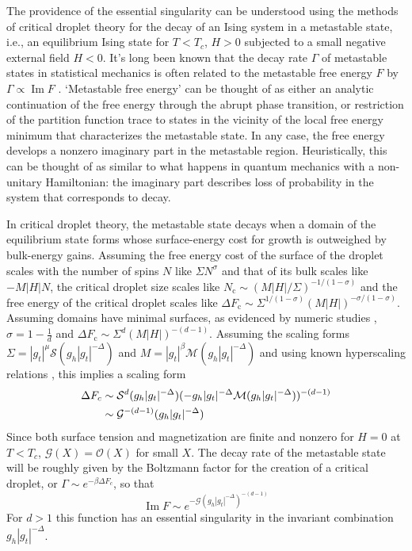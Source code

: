 \documentclass[aps,prl,reprint]{revtex4-1}
\def\[{\begin{equation}}
\def\]{\end{equation}}
\def\im{\mathop{\mathrm{Im}}\nolimits}
\def\O{\mathcal O}
\def\c{\mathrm c}
\begin{document}
The providence of the essential singularity can be understood using the
methods of critical droplet theory for the decay of an Ising system in a
metastable state, i.e., an equilibrium Ising state for $T<T_c$, $H>0$
subjected to a small negative external field $H<0$.
It's long been known that the decay rate $\Gamma$ of metastable states in
statistical mechanics is often related to the metastable free energy $F$ by
$\Gamma\propto\im F$
\cite{langer.1967.condensation,langer.1969.metastable,gaveau.1989.analytic,privman.1982.analytic}.
`Metastable free energy' can be thought of as either an analytic continuation of the free energy
through the abrupt phase transition, or restriction of the partition function
trace to states in the vicinity of the local free energy minimum that
characterizes the metastable state. In any case, the free energy develops a
nonzero imaginary part in the metastable region. Heuristically, this can be
thought of as similar to what happens in quantum mechanics with a non-unitary
Hamiltonian: the imaginary part describes loss of probability in the system
that corresponds to decay. 

In critical droplet theory, the metastable state decays when a domain of the
equilibrium state forms whose surface-energy cost for growth is outweighed by
bulk-energy gains. Assuming the free energy cost of the surface of the droplet
scales with the number of spins $N$ like $\Sigma N^\sigma$ and that of its
bulk scales like $-M|H|N$, the critical droplet size scales like
$N_\c\sim(M|H|/\Sigma)^{-1/(1-\sigma)}$ and the free energy of the critical
droplet scales like $\Delta F_\c\sim\Sigma^{1/(1-\sigma)}(M|H|)^{-\sigma/(1-\sigma)}$.
Assuming domains have minimal surfaces, as evidenced by numeric studies
\cite{gunther.1993.transfer-matrix}, $\sigma=1-\frac1d$ and
$\Delta F_\c\sim\Sigma^d(M|H|)^{-(d-1)}$. Assuming the scaling forms
$\Sigma=|g_t|^\mu\mathcal S(g_h|g_t|^{-\Delta})$ and $M=|g_t|^\beta\mathcal
M(g_h|g_t|^{-\Delta})$ and using known hyperscaling relations
\cite{widom.1981.interface}, this implies a scaling form
\begin{align}
  \Delta F_c&
  \sim\mathcal S^d(g_h|g_t|^{-\Delta})(-g_h|g_t|^{-\Delta}\mathcal
    M(g_h|g_t|^{-\Delta}))^{-(d-1)}\notag\\
  &\sim\mathcal G^{-(d-1)}(g_h|g_t|^{-\Delta})
\end{align}
Since both surface tension and magnetization are finite and nonzero for $H=0$
at $T<T_c$, $\mathcal G(X)=\O(X)$ for small $X$.
The decay rate of the metastable state will be roughly given by the Boltzmann
factor for the creation of a critical droplet, or $\Gamma\sim e^{-\beta\Delta
F_c}$, so that
\[
  \im F\sim e^{-\mathcal G(g_h|g_t|^{-\Delta})^{-(d-1)}}
\]
For $d>1$ this function has an essential singularity in the invariant
combination $g_h|g_t|^{-\Delta}$.
\end{document}
